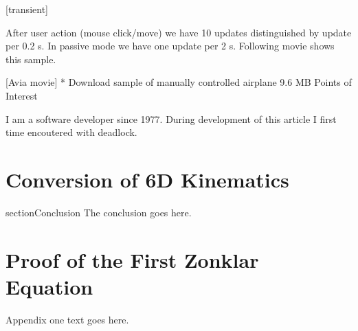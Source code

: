 \documentclass[10pt,journal,compsoc]{IEEEtran}
\begin{document}
{[transient]}

After user action (mouse click/move) we have 10 updates distinguished by update per 0.2 s. In passive mode we have one update per 2 s. Following movie shows this sample.

{[Avia movie]}
* {Download sample of manually controlled airplane 9.6 MB} 
Points of Interest

I am a software developer since 1977. During development of this article I first time encoutered with deadlock.

	
	
\section{Conversion of 6D Kinematics}
section{Conclusion}
	The conclusion goes here.
	
	
	
	
	
	
	
	
	\appendices
	\section{Proof of the First Zonklar Equation}
	Appendix one text goes here.
	
\end{document}
